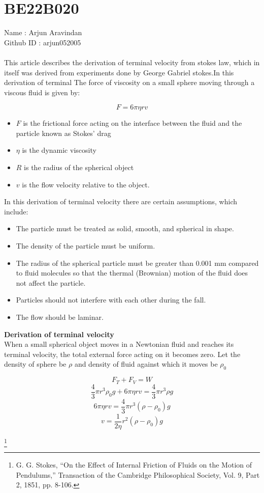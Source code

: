 \section*{BE22B020}
Name : Arjun Aravindan \\
Github ID : arjun052005\\
\\
This article describes the derivation of terminal velocity from stokes law, which in itself was derived from experiments done by George Gabriel stokes.In this derivation of terminal 
The force of viscosity on a small sphere moving through a viscous fluid is given by:

\[F = 6 \pi \eta rv\]
\small{\begin{itemize}

\item $F$ is the frictional force acting on the interface between the fluid and the particle known as Stokes' drag
\item $\eta$ is the dynamic viscosity
\item $R$ is the radius of the spherical object
\item $v$ is the flow velocity relative to the object.

\end{itemize}}

In this derivation of terminal velocity there are certain assumptions, which include:
\small{\begin{itemize}

\item  The particle must be treated as solid, smooth, and spherical in shape.
\item  The density of the particle must be uniform.
\item  The radius of the spherical particle must be greater than 0.001 mm compared to fluid molecules so that the thermal (Brownian) motion of the fluid does not affect the particle.
\item Particles should not interfere with each other during the fall.
\item The flow should be laminar.

\end{itemize}}

\textbf{Derivation of terminal velocity}\\

When a small spherical object moves in a Newtonian fluid and reaches its terminal velocity, the total external force acting on it becomes zero. Let the density of sphere be $\rho$ and density of fluid against which it moves be $\rho_0$  

\[F_T + F_V = W\]
\[\frac{4}{3}  \pi r^3 \rho_0 g + 6 \pi \eta rv = \frac{4}{3} \pi r^3 \rho g\]
\[6 \pi \eta rv = \frac{4}{3} \pi r^3 ( \rho - \rho_0 )g\]
\[v = \frac{1}{2 \eta } r^2 ( \rho - \rho_0 )g\]

\footnote{G. G. Stokes, “On the Effect of Internal Friction of Fluids on the Motion of Pendulums,” Transaction of the Cambridge Philosophical Society, Vol. 9, Part 2, 1851, pp. 8-106.}
